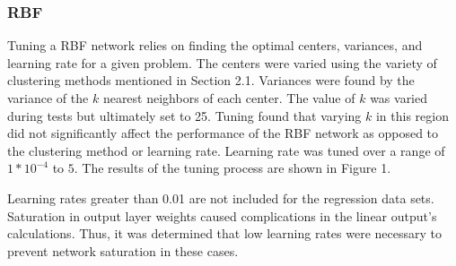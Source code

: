 \documentclass[twoside,10pt]{article}
\begin{document}
\subsubsection{RBF}
Tuning a RBF network relies on finding the optimal centers, variances, and learning rate for a given problem. The centers were varied using the variety of clustering methods mentioned in Section 2.1. Variances were found by the variance of the $k$ nearest neighbors of each center. The value of $k$ was varied during tests but ultimately set to 25. Tuning found that varying $k$ in this region did not significantly affect the performance of the RBF network as opposed to the clustering method or learning rate. Learning rate was tuned over a range of $1*10^{-4}$ to $5$. The results of the tuning process are shown in Figure 1.

Learning rates greater than 0.01 are not included for the regression data sets. Saturation in output layer weights caused complications in the linear output's calculations. Thus, it was determined that low learning rates were necessary to prevent network saturation in these cases.
\end{document}
